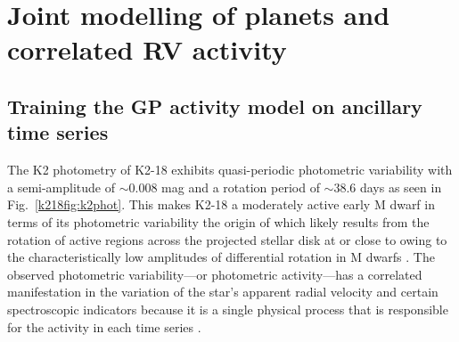 \section{Joint modelling of planets and correlated RV activity} \label{k218sect:joint}
\subsection{Training the GP activity model on ancillary time series} \label{k218sect:gp}
The K2 photometry of K2-18 exhibits quasi-periodic photometric variability with a
semi-amplitude of $\sim 0.008$ mag and a rotation period of \prot{} $\sim 38.6$ days as
seen in Fig.~\ref{k218fig:k2phot}. This makes K2-18
a moderately active early M dwarf in terms of its photometric variability \citep{newton16a}
the origin of which likely results from the rotation of active regions across the projected stellar
disk at or close to \prot{} owing to the characteristically low amplitudes of differential
rotation in M dwarfs \citep{kitchatinov11}. 
The observed photometric variability---or photometric activity---has
a correlated manifestation in the
variation of the star's apparent radial velocity and certain spectroscopic indicators
because it is a single physical process that is responsible for the activity in each
time series \citep{aigrain12}.

